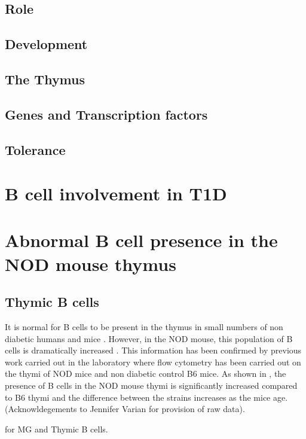 \subsection{Role}
\subsection{Development}
\subsection{The Thymus}
\subsection{Genes and Transcription factors}
\subsection{Tolerance}



\section{B cell involvement in T1D}

\section{Abnormal B cell presence in the NOD mouse thymus}
\subsection{Thymic B cells}

It is normal for B cells to be present in the thymus in small numbers \citep{Isaacson1987, Akashi2000} of non diabetic humans \citep{Isaacson1987} and mice \citep{Akashi2000}. 
However, in the NOD mouse, this population of B cells is dramatically increased \citep{OReilly1994}.
This information has been confirmed by previous work carried out in the laboratory where flow cytometry has been carried out on the thymi of NOD mice and non diabetic control B6 mice.
As shown in , the presence of B cells in the NOD mouse thymi is significantly increased compared to B6 thymi and the difference between the strains increases as the mice age. (Acknowldegements to Jennifer Varian for provision of raw data). 

  \citep{Christensson1998} for MG and Thymic B cells.


